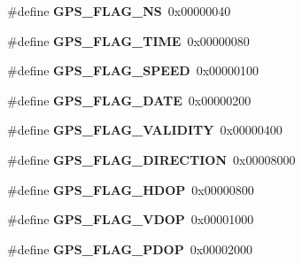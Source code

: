 \begin{DoxyCompactItemize}
\item 
\hypertarget{group___t_m___g_p_s___macros_ga0a38f772a5a99875c5740b55fe4883be}{}\#define {\bfseries G\+P\+S\+\_\+\+F\+L\+A\+G\+\_\+\+N\+S}~0x00000040\label{group___t_m___g_p_s___macros_ga0a38f772a5a99875c5740b55fe4883be}

\item 
\hypertarget{group___t_m___g_p_s___macros_gab3cd8fc75582c6a1fb0ff2d5e67a81ee}{}\#define {\bfseries G\+P\+S\+\_\+\+F\+L\+A\+G\+\_\+\+T\+I\+M\+E}~0x00000080\label{group___t_m___g_p_s___macros_gab3cd8fc75582c6a1fb0ff2d5e67a81ee}

\item 
\hypertarget{group___t_m___g_p_s___macros_gacc3efeb4af5972098b437a9cd3d704e1}{}\#define {\bfseries G\+P\+S\+\_\+\+F\+L\+A\+G\+\_\+\+S\+P\+E\+E\+D}~0x00000100\label{group___t_m___g_p_s___macros_gacc3efeb4af5972098b437a9cd3d704e1}

\item 
\hypertarget{group___t_m___g_p_s___macros_ga2d6c359348a48059c272709c4ac1d0c7}{}\#define {\bfseries G\+P\+S\+\_\+\+F\+L\+A\+G\+\_\+\+D\+A\+T\+E}~0x00000200\label{group___t_m___g_p_s___macros_ga2d6c359348a48059c272709c4ac1d0c7}

\item 
\hypertarget{group___t_m___g_p_s___macros_gafc47a33de48183cf5d9eea64e45d528c}{}\#define {\bfseries G\+P\+S\+\_\+\+F\+L\+A\+G\+\_\+\+V\+A\+L\+I\+D\+I\+T\+Y}~0x00000400\label{group___t_m___g_p_s___macros_gafc47a33de48183cf5d9eea64e45d528c}

\item 
\hypertarget{group___t_m___g_p_s___macros_ga3b0affe8ae20e112fa4bb175699ee5dd}{}\#define {\bfseries G\+P\+S\+\_\+\+F\+L\+A\+G\+\_\+\+D\+I\+R\+E\+C\+T\+I\+O\+N}~0x00008000\label{group___t_m___g_p_s___macros_ga3b0affe8ae20e112fa4bb175699ee5dd}

\item 
\hypertarget{group___t_m___g_p_s___macros_ga2f8cbc31ea5be9a7d743b2308b4e4484}{}\#define {\bfseries G\+P\+S\+\_\+\+F\+L\+A\+G\+\_\+\+H\+D\+O\+P}~0x00000800\label{group___t_m___g_p_s___macros_ga2f8cbc31ea5be9a7d743b2308b4e4484}

\item 
\hypertarget{group___t_m___g_p_s___macros_ga940b5a76c55e794a0251e73e88f23a49}{}\#define {\bfseries G\+P\+S\+\_\+\+F\+L\+A\+G\+\_\+\+V\+D\+O\+P}~0x00001000\label{group___t_m___g_p_s___macros_ga940b5a76c55e794a0251e73e88f23a49}

\item 
\hypertarget{group___t_m___g_p_s___macros_gad635e68f817182b5568ab577132ba194}{}\#define {\bfseries G\+P\+S\+\_\+\+F\+L\+A\+G\+\_\+\+P\+D\+O\+P}~0x00002000\label{group___t_m___g_p_s___macros_gad635e68f817182b5568ab577132ba194}


\end{DoxyCompactItemize}
